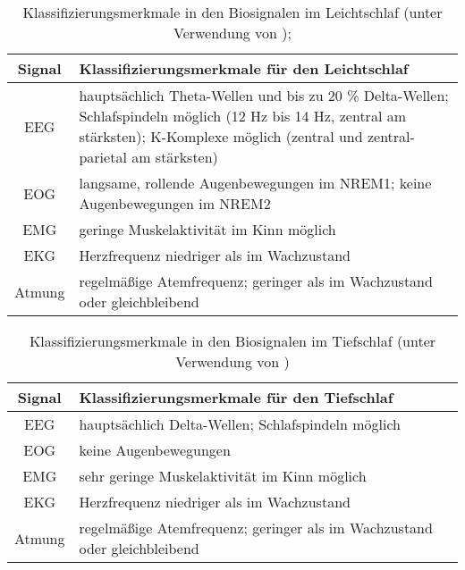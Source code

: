 \begin{table}[H] 
\begin{small}
\begin{tabularx}{\textwidth}{cX}
\toprule
\multicolumn{1}{c}{\textbf{Signal}} & \multicolumn{1}{l}{\textbf{Klassifizierungsmerkmale für den Leichtschlaf}}\\  
\midrule
\acs{EEG} & hauptsächlich Theta-Wellen und bis zu 20 \% Delta-Wellen; Schlafspindeln möglich (12 Hz bis 14 Hz, zentral am stärksten); K-Komplexe möglich (zentral und zentral-parietal am stärksten)\\
\acs{EOG} & langsame, rollende Augenbewegungen im \acs{NREM}1; keine Augenbewegungen im \acs{NREM}2\\
\acs{EMG} & geringe Muskelaktivität im Kinn möglich\\
\acs{EKG} & Herzfrequenz niedriger als im Wachzustand\\
Atmung & regelmäßige Atemfrequenz; geringer als im Wachzustand oder gleichbleibend\\
\bottomrule
\end{tabularx}
\caption[Klassifizierungsmerkmale im Leichtschlaf]{Klassifizierungsmerkmale in den Biosignalen im Leichtschlaf (unter Verwendung von \parencite{lee-chiong_sleep_2008, steinberg_schlafmedizin_2010, rasche_update_2003, ebner_eeg_2006});}
\label{tab:leichtschlaf}
\end{small}
\end{table}


\begin{table}[H] 
\begin{small}
\begin{tabularx}{\textwidth}{cX}
\toprule
\multicolumn{1}{c}{\textbf{Signal}} & \multicolumn{1}{l}{\textbf{Klassifizierungsmerkmale für den Tiefschlaf}}\\  
\midrule
\acs{EEG} & hauptsächlich Delta-Wellen; Schlafspindeln möglich\\
\acs{EOG} & keine Augenbewegungen\\
\acs{EMG} & sehr geringe Muskelaktivität im Kinn möglich\\
\acs{EKG} & Herzfrequenz niedriger als im Wachzustand\\
Atmung & regelmäßige Atemfrequenz; geringer als im Wachzustand oder gleichbleibend\\
\bottomrule
\end{tabularx}
\caption[Klassifizierungsmerkmale im Tiefschlaf]{Klassifizierungsmerkmale in den Biosignalen im Tiefschlaf (unter Verwendung von \parencite{lee-chiong_sleep_2008, steinberg_schlafmedizin_2010, rasche_update_2003, ebner_eeg_2006})}
\label{tab:tiefschlaf}
\end{small}
\end{table}


